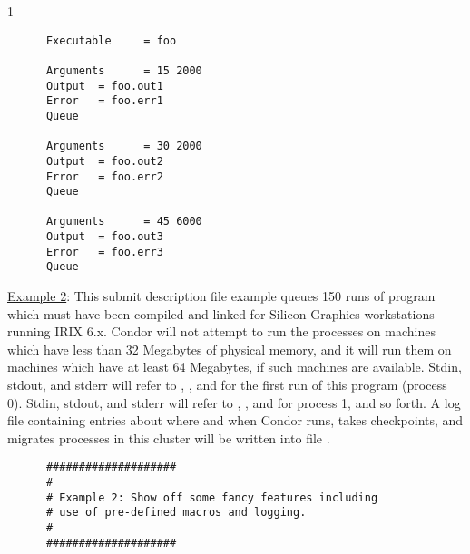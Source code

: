 \begin{ManPage}{\label{man-condor-submit}}{1}
\begin{verbatim}
      Executable     = foo                                                   
                                                                         
      Arguments      = 15 2000                                               
      Output  = foo.out1                                                     
      Error   = foo.err1
      Queue                                                                  
                                                                         
      Arguments      = 30 2000                                               
      Output  = foo.out2                                                     
      Error   = foo.err2
      Queue                                                                  
                                                                         
      Arguments      = 45 6000                                               
      Output  = foo.out3                                                     
      Error   = foo.err3
      Queue                   
\end{verbatim}

\underline{Example 2}: This submit description file example queues 150
runs of program  which must have been compiled and linked for
Silicon Graphics workstations running IRIX 6.x.
Condor will not attempt
to run the processes on machines which have less than 32 Megabytes of
physical memory, and it will run them on machines which have at least 64
Megabytes, if such machines are available.
Stdin, stdout, and stderr will
refer to , , and  for the first run
of this program (process 0).
Stdin, stdout, and stderr will refer to
, , and  for process 1, and so forth.
A log file containing entries
about where and when Condor runs, takes checkpoints, and migrates processes
in this cluster will be written into file .

\begin{verbatim}
      ####################                                                    
      #                                                                       
      # Example 2: Show off some fancy features including
      # use of pre-defined macros and logging.                                
      #                                                                       
      ####################                                                    
                                                                          

\end{verbatim}
\end{ManPage}
